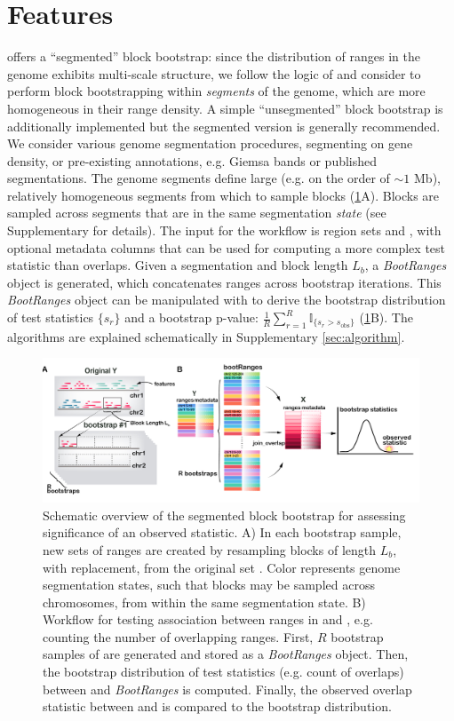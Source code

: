 \section{Features}

\bootranges offers a ``segmented'' block bootstrap:
since the distribution of ranges in the genome exhibits multi-scale
structure, we follow the logic of \citet{bickel2010subsampling} and consider to
perform block bootstrapping within \textit{segments} of the genome, which are
more homogeneous in their range density.
A simple ``unsegmented'' block bootstrap is additionally
  implemented but the segmented version is generally recommended.  We
  consider various genome segmentation procedures, segmenting on gene
  density, or pre-existing annotations, e.g. Giemsa bands or
published segmentations.
The genome segments define large (e.g. on the order of ${\sim}1$ Mb),
relatively homogeneous segments from which to sample blocks
(\cref{fig:framework}A).
Blocks are sampled across segments that are in the same
  segmentation \textit{state} (see Supplementary for details).
The input for the workflow is region sets  and
, with optional metadata columns that can be
used for computing a more complex test statistic than overlaps.
Given a segmentation and block length $L_b$, a \textit{BootRanges}
object is generated, which concatenates ranges across bootstrap
iterations. This \textit{BootRanges} object can be manipulated with \plyranges
to derive the bootstrap distribution of test statistics $\{s_r\}$ and a
bootstrap p-value:
$ \frac{1}{R} \sum_{r=1}^R \mathbb{I}_{\{s_r > s_\text{obs}\}} $ (\cref{fig:framework}B).
The \bootranges algorithms are explained schematically in Supplementary \cref{sec:algorithm}.


\begin{figure}[t]
\centering
\setlength{\abovecaptionskip}{-0.05cm}
\includegraphics[width=.5\textwidth]{Figures/bootRanges.jpeg}
\caption{
  Schematic overview of the segmented block bootstrap 
  for assessing significance of an observed statistic.
  A) In each bootstrap sample, 
  new sets of ranges are created by resampling blocks of length 
  $L_b$, with replacement, from the original set . 
  Color represents genome segmentation states, such that blocks 
  may be sampled across chromosomes, from within the same 
  segmentation state.
  B) Workflow for testing association between 
  ranges in  and ,  
  e.g. counting the number of overlapping ranges. 
  First, $R$ bootstrap samples of  are 
  generated and stored as a \textit{BootRanges} object.
  Then, the bootstrap distribution of test statistics 
  (e.g. count of overlaps) 
  between  and \textit{BootRanges} is computed.
  Finally, the observed overlap statistic between  and  
  is compared to the bootstrap distribution.}
\label{fig:framework}
\end{figure}


